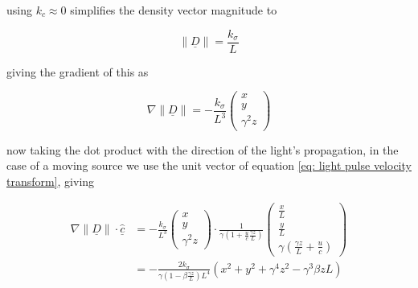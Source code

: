 \begin{derivation}

	using $k_c \approx 0$ simplifies the density vector magnitude to

	\begin{equation}
		\| \underline{D} \| = \frac{k_\sigma}{L}
	\end{equation}

	giving the gradient of this as

	\begin{equation}
		\nabla \| \underline{D} \| = -\frac{k_\sigma}{L^3}
		\begin{pmatrix}
			x \\
			y \\
			\gamma^2 z
		\end{pmatrix}
	\end{equation}

	now taking the dot product with the direction of the light's propagation, in the case of a moving source we use the unit vector of equation \eqref{eq: light pulse velocity transform}, giving

	\begin{equation}
		\begin{aligned}
			\nabla \| \underline{D} \| \cdot \underline{\hat{c}}
			 & = -\frac{k_\sigma}{L^3}
			\begin{pmatrix}
				x \\
				y \\
				\gamma^2 z
			\end{pmatrix}
			\cdot
			\frac{1}{ \gamma \left( 1 + \frac{u}{c} \frac{\gamma {z}}{L} \right) }
			\begin{pmatrix}
				\frac{{x}}{L} \\
				\frac{{y}}{L} \\
				\gamma \left( \frac{\gamma {z}}{L} + \frac{u}{c} \right)
			\end{pmatrix}                                              \\
			 & = -\frac{2k_\sigma}{\gamma\left(1-\beta\frac{\gamma z}{L}\right)L^4} \left( x^2 + y^2 + \gamma^4 z^2 - \gamma^3 \beta z L \right)
		\end{aligned}
	\end{equation}

\end{derivation}






